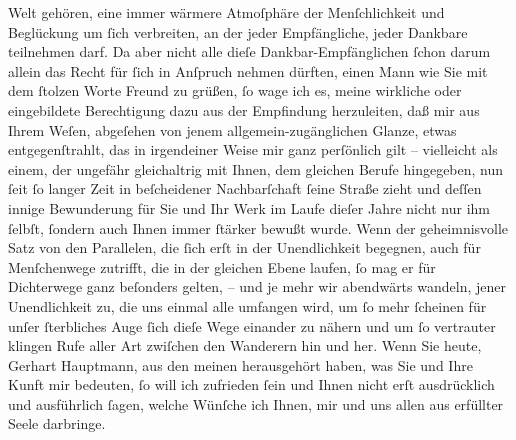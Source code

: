 \begin{ledgroupsized}[t]{13cm}
               Welt gehören, eine immer wärmere Atmoſphäre der Menſchlichkeit und Beglückung um ſich
               verbreiten, an der jeder Empfängliche, jeder Dankbare teilnehmen darf. Da aber nicht
               alle dieſe Dankbar-Empfänglichen ſchon darum allein das Recht für ſich in Anſpruch
               nehmen dürften, einen Mann wie Sie mit dem ſtolzen Worte Freund zu grüßen, ſo wage
               ich es, meine wirkliche oder eingebildete Berechtigung dazu aus der Empfindung
               herzuleiten, daß mir aus Ihrem Weſen, abgeſehen von jenem allgemein-zugänglichen
               Glanze, etwas entgegenſtrahlt, das in irgendeiner Weise mir ganz perſönlich gilt –
               vielleicht als einem, der ungefähr gleichaltrig mit Ihnen, dem gleichen Berufe
               hingegeben, nun ſeit ſo langer Zeit in beſcheidener Nachbarſchaft ſeine Straße zieht
               und deſſen innige Bewunderung für Sie und Ihr Werk im Laufe dieſer Jahre nicht nur
               ihm ſelbſt, ſondern auch Ihnen immer ſtärker bewußt wurde. Wenn der geheimnisvolle
               Satz von den Parallelen, die ſich erſt in der Unendlichkeit begegnen, auch für
               Menſchenwege zutrifft, die in der gleichen Ebene laufen, ſo mag er für Dichterwege
               ganz beſonders gelten, – und je mehr wir abendwärts wandeln, jener Unendlichkeit zu,
               die uns einmal alle umfangen wird, um ſo mehr ſcheinen für unſer ſterbliches Auge
               ſich dieſe Wege einander zu nähern und um ſo vertrauter klingen Rufe aller Art
               zwiſchen den Wanderern hin und her. Wenn Sie heute, Gerhart Hauptmann, aus den meinen
               herausgehört haben, was Sie und Ihre Kunft mir bedeuten, ſo will ich zufrieden ſein
               und Ihnen nicht erſt ausdrücklich und ausführlich ſagen, welche Wünſche ich Ihnen,
               mir und uns allen aus erfüllter Seele darbringe.\pend
           \endnumbering{}\end{ledgroupsized}  \newcommand{\dateiname}{L02377}\newcommand{\titel}{Arthur Schnitzler an Gerhart Hauptmann, 17. 3. 1922}\newcommand{\editorInnen}{ Martin Anton Müller und Gerd-Hermann Susen}
            \footnotesize
\begin{ledgroupsized}[t]{11.5cm}
\end{ledgroupsized}
         
      